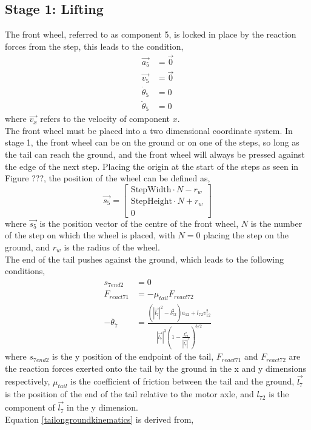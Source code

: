 \subsection*{Stage 1: Lifting}
The front wheel, referred to as component 5, is locked in place by the reaction forces from the step, this leads to the condition,
\begin{subequations}
	\label{wheel1locked}
	\begin{align}
		\vec{a_5} &= \vec{0}\\
		\vec{v_5} &= \vec{0}\\
		\dot{\theta}_5 &= 0\\
		\ddot{\theta}_5 &= 0
	\end{align}
\end{subequations}
where $\vec{v_x}$ refers to the velocity of component $x$.\\
The front wheel must be placed into a two dimensional coordinate system. In stage 1, the front wheel can be on the ground or on one of the steps, so long as the tail can reach the ground, and the front wheel will always be pressed against the edge of the next step. Placing the origin at the start of the steps as seen in Figure ???, the position of the wheel can be defined as,
\begin{equation}
	\vec{s_5}
	=
	\begin{bmatrix}
		\mathrm{StepWidth}\cdot N-r_w\\
		\mathrm{StepHeight}\cdot N+r_w\\
		0
	\end{bmatrix}
\end{equation}
where $\vec{s_5}$ is the position vector of the centre of the front wheel, $N$ is the number of the step on which the wheel is placed, with $N = 0$ placing the step on the ground, and $r_w$ is the radius of the wheel.\\
The end of the tail pushes against the ground, which leads to the following conditions,
\begin{subequations}
	\label{tailonground}
	\begin{align}
		s_{7end2} &= 0\\
		F_{react71} &=  -\mu_{tail}F_{react72}\\
		-\ddot{\theta_7} &= \frac{(|\vec{l_7}|^2 - l_{72}^2)a_{12} + l_{72}v_{12}^2}{|\vec{l_7}|^3 (1 - \frac{l_{72}^2}{|\vec{l_7}|^2})^{3/2}} \label{tailongroundkinematics}
	\end{align}
\end{subequations}
where $s_{7end2}$ is the y position of the endpoint of the tail, $F_{react71}$ and $F_{react72}$ are the reaction forces exerted onto the tail by the ground in the x and y dimensions respectively, $\mu_{tail}$ is the coefficient of friction between the tail and the ground, $\vec{l_7}$ is the position of the end of the tail relative to the motor axle, and $l_{72}$ is the component of $\vec{l_7}$ in the y dimension. \\
Equation \ref{tailongroundkinematics} is derived from,

